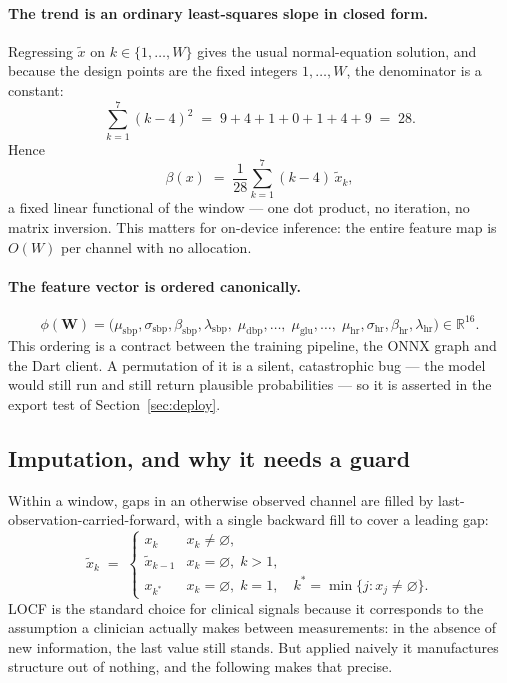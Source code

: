 \documentclass[11pt,a4paper]{article}
\newcommand{\R}{\mathbb{R}}
\newcommand{\sbp}{\mathrm{sbp}}
\newcommand{\dbp}{\mathrm{dbp}}
\newcommand{\glu}{\mathrm{glu}}
\newcommand{\hr}{\mathrm{hr}}
\begin{document}
\paragraph{The trend is an ordinary least-squares slope in closed form.}
Regressing $\tilde{x}$ on $k\in\{1,\dots,W\}$ gives the usual normal-equation
solution, and because the design points are the fixed integers $1,\dots,W$, the
denominator is a constant:
\[
  \sum_{k=1}^{7}(k-4)^2 \;=\; 9+4+1+0+1+4+9 \;=\; 28 .
\]
Hence
\[
  \beta(x) \;=\; \frac{1}{28}\sum_{k=1}^{7}(k-4)\,\tilde{x}_k ,
\]
a fixed linear functional of the window --- one dot product, no iteration, no
matrix inversion. This matters for on-device inference: the entire feature map is
$O(W)$ per channel with no allocation.

\paragraph{The feature vector is ordered canonically.}
\[
  \phi(\mathbf{W}) = \bigl(
  \mu_{\sbp},\sigma_{\sbp},\beta_{\sbp},\lambda_{\sbp},\;
  \mu_{\dbp},\dots,\;
  \mu_{\glu},\dots,\;
  \mu_{\hr},\sigma_{\hr},\beta_{\hr},\lambda_{\hr}\bigr) \in \R^{16}.
\]
This ordering is a contract between the training pipeline, the ONNX graph and the
Dart client. A permutation of it is a silent, catastrophic bug --- the model would
still run and still return plausible probabilities --- so it is asserted in the
export test of Section~\ref{sec:deploy}.

\subsection{Imputation, and why it needs a guard}
\label{sec:locf}

Within a window, gaps in an otherwise observed channel are filled by
last-observation-carried-forward, with a single backward fill to cover a leading
gap:
\[
  \tilde{x}_k \;=\;
  \begin{cases}
    x_k & x_k \ne \varnothing,\\
    \tilde{x}_{k-1} & x_k = \varnothing,\; k>1,\\
    x_{k^\ast} & x_k = \varnothing,\; k=1,\quad k^\ast=\min\{j: x_j\ne\varnothing\}.
  \end{cases}
\]
LOCF is the standard choice for clinical signals because it corresponds to the
assumption a clinician actually makes between measurements: in the absence of new
information, the last value still stands. But applied naively it manufactures
structure out of nothing, and the following makes that precise.
\end{document}
